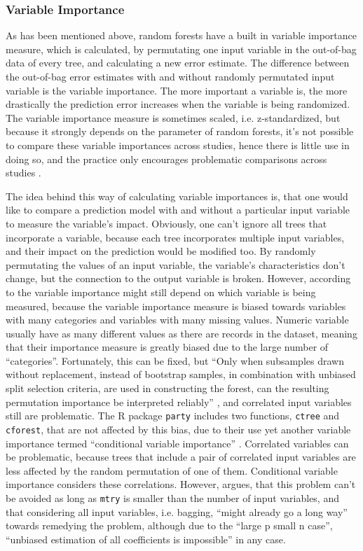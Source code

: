 \documentclass[a4paper,man,12pt,apacite,floatsintext,draftfirst]{apa6} %
\begin{document}
\subsubsection{Variable Importance}
As has been mentioned above, random forests have a built in variable
importance measure, which is calculated, by permutating one input variable
in the out-of-bag data of every tree, and calculating a new error estimate.
The difference between the out-of-bag error estimates with and without
randomly permutated input variable is the variable importance.
The more important a variable is, the more drastically the prediction error
increases when the variable is being randomized.
The variable importance measure is sometimes scaled, i.e. z-standardized,
but because it strongly depends on the parameter of random forests,
it's not possible to compare these variable importances across studies,
hence there is little use in doing so, and the practice only encourages
problematic comparisons across studies \cite{strobl2009introduction}.

The idea behind this way of calculating variable importances is,
that one would like to compare a prediction model with and without a
particular input variable to measure the variable's impact.
Obviously, one can't ignore all trees that incorporate a variable,
because each tree incorporates multiple input variables, and their impact
on the prediction would be modified too.
By randomly permutating the values of an input variable,
the variable's characteristics don't change, but the connection to the
output variable is broken.
However, according to \cite{strobl2007bias} the variable importance might
still depend on which variable is being measured, because the
variable importance measure is biased towards variables with many categories
and variables with many missing values.
Numeric variable usually have as many different values as there are records
in the dataset, meaning that their importance measure is greatly biased due
to the large number of “categories”.
Fortunately, this can be fixed, but “Only when subsamples drawn without
replacement, instead of bootstrap samples, in combination with unbiased
split selection criteria, are used in constructing the forest, can the
resulting permutation importance be interpreted reliably”
\cite{strobl2007bias}, and correlated input variables still are
problematic.
The R package \texttt{party} includes two functions, \texttt{ctree} and
\texttt{cforest}, that are not affected by this bias, due to their use
yet another variable importance termed “conditional variable importance”
\cite{strobl2008conditional}.
Correlated variables can be problematic, because trees that include a
pair of correlated input variables are less affected by the random
permutation of one of them.
Conditional variable importance considers these correlations.
However, \cite{gromping2009variable} argues, that this problem can't be avoided
as long as \texttt{mtry} is smaller than the number of input variables,
and that considering all input variables, i.e. bagging,
“might already go a long way” towards remedying the problem,
although due to the “large p small n case”, “unbiased estimation of all
coefficients is impossible” in any case.
\end{document}
